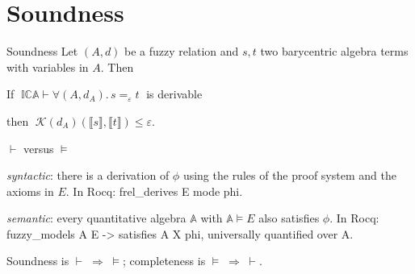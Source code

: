 \documentclass[10pt,aspectratio=169]{beamer}
\makeatletter
\newcommand{\ptag}[1]{\hfill\textit{#1}}
\newcommand{\soundnessscript}{%
\pline{0}{Theorem derives\_fin\_sound (A : FuzzyAlgebra R sig)}
\pline{0}{\ \ \ \ (E : fuzzy\_theory R sig) (X : fuzzy\_space R)}
\pline{0}{\ \ \ \ (phi : @judgement R sig (fcarrier X)) :}
\pline{0}{\ \ fuzzy\_models A E -> derives\_fin E phi ->}
\pline{0}{\ \ satisfies A X phi.}
\pline{1}{Proof.}
\pline{2}{\ \ rewrite /fuzzy\_models /satisfies /derives\_fin.}
\pline{2}{\ \ move => Hmodel Hderive rho.}
\pline{3}{\ \ remember FRelFinite as mode eqn:Hmode in Hderive.}
\pline{3}{\ \ revert Hmode.}
\pline{4}{\ \ induction Hderive; intros Hmode.}
\pline{5}{\ \ - apply: Hmodel X phi H rho.\ptag{Init}}
\pline{5}{\ \ - by [].\ptag{EqRefl}}
\pline{5}{\ \ - symmetry. exact: IHHderive ...\ptag{EqSym}}
\pline{5}{\ \ - by rewrite (IHHderive1 ...) ...\ptag{EqTrans}}
\pline{5}{\ \ - congr fa\_ops; apply ...\ptag{EqCong}}
\pline{6}{\ \ - apply: (interpretation\_nexp rho).\ptag{UseVars}}
\pline{7}{\ \ - apply: satisfies\_subst. ...\ptag{Subst}}
\pline{8}{\ \ - rewrite (IHHderive1 ...). ...\ptag{QEqRepL}}
\pline{8}{\ \ - rewrite -(IHHderive2 ...). ...\ptag{QEqRepR}}
\pline{8}{\ \ - apply: le\_trans ... H.\ptag{Up}}
\pline{8}{\ \ - apply: (andP (frel\_range ...)).2\ptag{Max}}
\pline{8}{\ \ - discriminate Hmode.\ptag{OrderCompl}}
\pline{8}{Qed.}
}
\newcommand{\qeq}[1]{=_{#1}}
\newcommand{\den}[1]{\llbracket #1 \rrbracket}
\newcommand{\ICA}{\mathbb{I}\mathbb{C}\mathbb{A}}
\newcommand{\eps}{\varepsilon}
\newcommand{\Kan}{\mathcal{K}}
\newcommand{\rid}[1]{{\ttfamily\small #1}}
\makeatother
\begin{document}
\section{Soundness}

\begin{frame}{Soundness}
  Let $(A,d)$ be a fuzzy relation and $s,t$ two barycentric algebra
  terms with variables in $A$. Then
  \vfill
  \begin{block}{}
    If $\;\ICA \vdash \forall(A,d_A).\, s \qeq{\eps} t\;$ is derivable
    \vspace{0.5em}

    then $\;\Kan(d_A)(\den{s},\den{t}) \leq \eps$.
  \end{block}
  \vfill
  \pause
  \begin{alertblock}{$\vdash$ versus $\models$}
    \begin{description}\small
      \item[$E \vdash \phi$] \emph{syntactic}: there is a derivation of
        $\phi$ using the rules of the proof system and the axioms in
        $E$. In Rocq: \rid{frel\_derives E mode phi}.
      \item[$E \models \phi$] \emph{semantic}: every quantitative
        algebra $\mathbb{A}$ with $\mathbb{A} \models E$ also satisfies
        $\phi$. In Rocq: \rid{fuzzy\_models A E -> satisfies A X phi},
        universally quantified over \rid{A}.
    \end{description}
    \vspace{0.4em}
    Soundness is $\vdash\;\Rightarrow\;\models$; completeness is
    $\models\;\Rightarrow\;\vdash$.
  \end{alertblock}
\end{frame}

\newcommand{\sndpane}[1]{%
  \begin{scriptbox}[fontupper=\ttfamily\fontsize{5.8pt}{6.6pt}\selectfont\frenchspacing]%
  \pstep{#1}\soundnessscript\end{scriptbox}}
\end{document}
